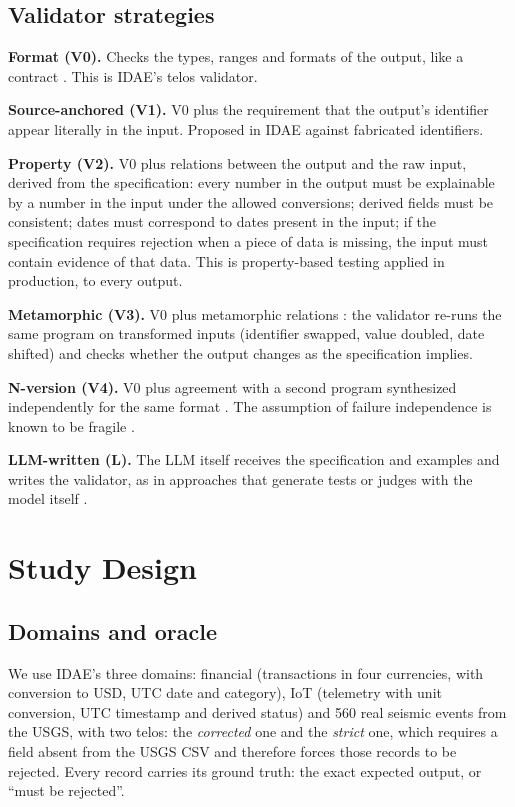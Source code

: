 \documentclass[sigconf,nonacm]{acmart}
\begin{document}
\subsection{Validator strategies}

\textbf{Format (V0).} Checks the types, ranges and formats of the output, like a contract \cite{meyer1997object}. This is IDAE's telos validator.

\textbf{Source-anchored (V1).} V0 plus the requirement that the output's identifier appear literally in the input. Proposed in IDAE against fabricated identifiers.

\textbf{Property (V2).} V0 plus relations between the output and the raw input, derived from the specification: every number in the output must be explainable by a number in the input under the allowed conversions; derived fields must be consistent; dates must correspond to dates present in the input; if the specification requires rejection when a piece of data is missing, the input must contain evidence of that data. This is property-based testing \cite{claessen2000quickcheck} applied in production, to every output.

\textbf{Metamorphic (V3).} V0 plus metamorphic relations \cite{chen1998metamorphic,segura2016survey}: the validator re-runs the same program on transformed inputs (identifier swapped, value doubled, date shifted) and checks whether the output changes as the specification implies.

\textbf{N-version (V4).} V0 plus agreement with a second program synthesized independently for the same format \cite{avizienis1985nversion,ron2024galapagos}. The assumption of failure independence is known to be fragile \cite{knight1986experimental}.

\textbf{LLM-written (L).} The LLM itself receives the specification and examples and writes the validator, as in approaches that generate tests or judges with the model itself \cite{chen2022codet,zheng2023judging}.

\section{Study Design}
\label{sec:desenho}

\subsection{Domains and oracle}

We use IDAE's three domains: financial (transactions in four currencies, with conversion to USD, UTC date and category), IoT (telemetry with unit conversion, UTC timestamp and derived status) and 560 real seismic events from the USGS, with two telos: the \textit{corrected} one and the \textit{strict} one, which requires a field absent from the USGS CSV and therefore forces those records to be rejected. Every record carries its ground truth: the exact expected output, or ``must be rejected''.
\end{document}
